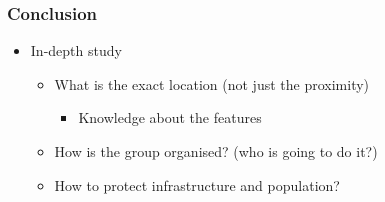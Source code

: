\begin{frame}
\frametitle{Conclusion}

\begin{itemize}
\item In-depth study
\begin{itemize}
\item What is the exact location (not just the proximity)
\begin{itemize}
\item Knowledge about the features
\end{itemize}
\item How is the group organised? (who is going to do it?)
\item How to protect infrastructure and population?
\end{itemize}

\end{itemize}
\end{frame}


